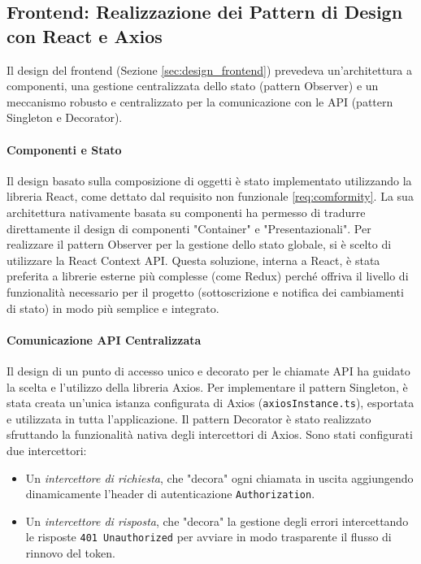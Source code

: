\documentclass[12pt,a4paper,openright,twoside]{book}
\begin{document}
\subsection{Frontend: Realizzazione dei Pattern di Design con React e Axios}
Il design del frontend (Sezione \ref{sec:design_frontend}) prevedeva un'architettura a componenti, una gestione centralizzata dello stato (pattern Observer) e un meccanismo robusto e centralizzato per la comunicazione con le API (pattern Singleton e Decorator).

\paragraph{Componenti e Stato}
Il design basato sulla composizione di oggetti è stato implementato utilizzando la libreria React, come dettato dal requisito non funzionale \ref{req:comformity}. La sua architettura nativamente basata su componenti ha permesso di tradurre direttamente il design di componenti "Container" e "Presentazionali". Per realizzare il pattern Observer per la gestione dello stato globale, si è scelto di utilizzare la React Context API. Questa soluzione, interna a React, è stata preferita a librerie esterne più complesse (come Redux) perché offriva il livello di funzionalità necessario per il progetto (sottoscrizione e notifica dei cambiamenti di stato) in modo più semplice e integrato.

\paragraph{Comunicazione API Centralizzata}
Il design di un punto di accesso unico e decorato per le chiamate API ha guidato la scelta e l'utilizzo della libreria Axios. Per implementare il pattern Singleton, è stata creata un'unica istanza configurata di Axios (\texttt{axiosInstance.ts}), esportata e utilizzata in tutta l'applicazione. Il pattern Decorator è stato realizzato sfruttando la funzionalità nativa degli intercettori di Axios. Sono stati configurati due intercettori:
\begin{itemize}
    \item Un \textit{intercettore di richiesta}, che "decora" ogni chiamata in uscita aggiungendo dinamicamente l'header di autenticazione \texttt{Authorization}.
    \item Un \textit{intercettore di risposta}, che "decora" la gestione degli errori intercettando le risposte \texttt{401 Unauthorized} per avviare in modo trasparente il flusso di rinnovo del token.
\end{itemize}
\end{document}
